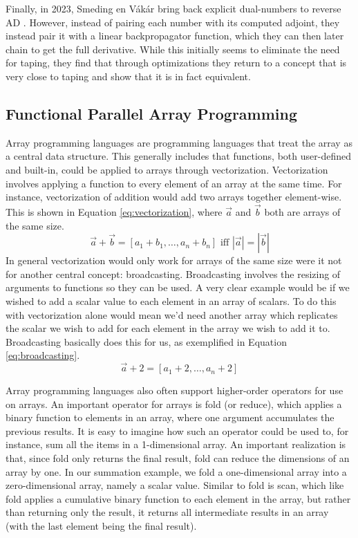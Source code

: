         Finally, in 2023, Smeding en Vákár bring back explicit dual-numbers to reverse AD \cite{smeding2023efficient}.
        However, instead of pairing each number with its computed adjoint, they instead pair it with a linear backpropagator function, which they can then later chain to get the full derivative.
        While this initially seems to eliminate the need for taping, they find that through optimizations they return to a concept that is very close to taping and show that it is in fact equivalent.

    \subsection{Functional Parallel Array Programming}
        Array programming languages are programming languages that treat the array as a central data structure.
        This generally includes that functions, both user-defined and built-in, could be applied to arrays through vectorization.
        Vectorization involves applying a function to every element of an array at the same time.
        For instance, vectorization of addition would add two arrays together element-wise.
        This is shown in Equation \ref{eq:vectorization}, where $\vec{a}$ and $\vec{b}$ both are arrays of the same size.
        \begin{equation} \label{eq:vectorization}
            \vec{a}+\vec{b}=[a_1+b_1,\dots,a_n+b_n]\text{ iff }|\vec{a}|=|\vec{b}|
        \end{equation}
        In general vectorization would only work for arrays of the same size were it not for another central concept: broadcasting.
        Broadcasting involves the resizing of arguments to functions so they can be used.
        A very clear example would be if we wished to add a scalar value to each element in an array of scalars.
        To do this with vectorization alone would mean we'd need another array which replicates the scalar we wish to add for each element in the array we wish to add it to.
        Broadcasting basically does this for us, as exemplified in Equation \ref{eq:broadcasting}.
        \begin{equation} \label{eq:broadcasting}
            \vec{a}+2=[a_1+2,\dots,a_n+2]
        \end{equation}
        
        Array programming languages also often support higher-order operators for use on arrays.
        An important operator for arrays is fold (or reduce), which applies a binary function to elements in an array, where one argument accumulates the previous results.
        It is easy to imagine how such an operator could be used to, for instance, sum all the items in a 1-dimensional array.
        An important realization is that, since fold only returns the final result, fold can reduce the dimensions of an array by one.
        In our summation example, we fold a one-dimensional array into a zero-dimensional array, namely a scalar value.
        Similar to fold is scan, which like fold applies a cumulative binary function to each element in the array, but rather than returning only the result, it returns all intermediate results in an array (with the last element being the final result).

